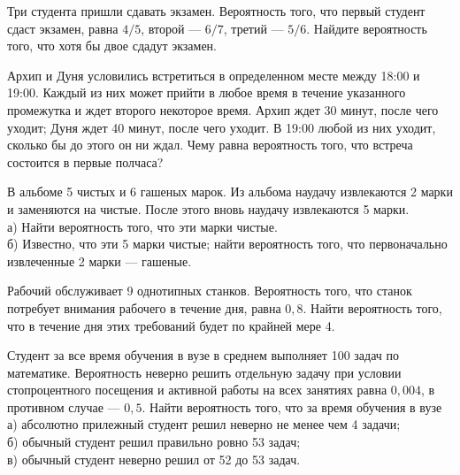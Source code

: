 \newpage\setcounter{zad}{0}



\begin{zkrW}{20}\noindent 
	Три студента пришли сдавать экзамен. Вероятность того, что первый студент сдаст экзамен, равна $4/5$, второй --- $6/7$, третий --- $5/6$. Найдите вероятность того, что хотя бы двое сдадут экзамен.
 
\end{zkrW}

\begin{zkrW}{20}\noindent 
	Архип и Дуня условились встретиться в определенном месте между 18:00 и 19:00. Каждый из них может прийти в любое время в течение указанного промежутка и ждет второго некоторое время. Архип ждет 30 минут, после чего уходит; Дуня ждет 40 минут, после чего уходит. В 19:00 любой из них уходит, сколько бы до этого он ни ждал. Чему равна вероятность того, что встреча состоится в первые полчаса?
 
\end{zkrW}

\begin{zkrW}{20}\noindent 
	В альбоме 5 чистых и 6 гашеных марок. Из альбома наудачу извлекаются 2 марки и заменяются на чистые. После этого вновь наудачу извлекаются 5 марки. \\ \indent а) Найти вероятность того, что эти марки чистые. \\ \indent б) Известно, что эти 5 марки чистые; найти вероятность того, что первоначально извлеченные 2 марки --- гашеные.
 
\end{zkrW}

\begin{zkrW}{20}\noindent 
	Рабочий обслуживает 9 однотипных станков. Вероятность того, что станок потребует внимания рабочего в течение дня, равна $0{,}8$. Найти вероятность того, что в течение дня этих требований будет по крайней мере 4.
 
\end{zkrW}

\begin{zkrW}{20}\noindent 
	Студент за все время обучения в вузе в среднем выполняет 100 задач по математике. Вероятность неверно решить отдельную задачу при условии стопроцентного посещения и активной работы на всех занятиях равна $0{,}004$, в противном случае --- $0{,}5$. Найти вероятность того, что за время обучения в вузе \\ \indent а) абсолютно прилежный студент решил неверно не менее чем 4 задачи; \\ \indent б) обычный студент решил правильно ровно 53 задач; \\ \indent в) обычный студент неверно решил от 52 до 53 задач.
 
\end{zkrW}

